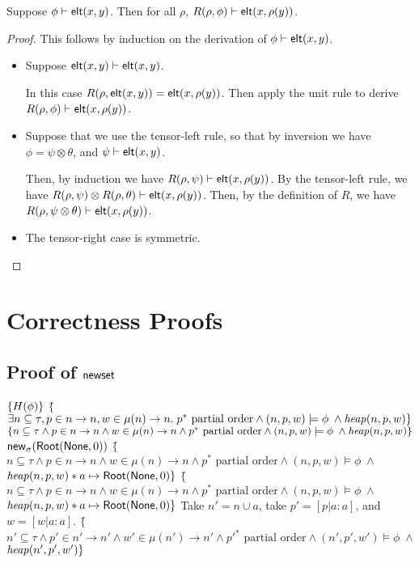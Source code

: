 \begin{lemma}
  Suppose ${\phi} \vdash \mathsf{elt}({x}, {y})$. Then for all $\rho$, ${R(\rho, \phi)} \vdash \mathsf{elt}({x}, {\rho(y)})$. 
\end{lemma}

\begin{proof}
This follows by induction on the derivation of ${\phi} \vdash \mathsf{elt}({x}, {y})$. 
\begin{itemize}
\item Suppose ${\mathsf{elt}({x}, {y})} \vdash \mathsf{elt}({x}, {y})$. 

In this case $R(\rho, \mathsf{elt}({x}, {y})) = \mathsf{elt}({x}, {\rho(y)})$. Then apply the 
unit rule to derive ${R(\rho, \phi)} \vdash \mathsf{elt}({x}, {\rho(y)})$. 

\item Suppose that we use the tensor-left rule, so that by inversion we have
$\phi = \psi \otimes \theta$, and ${\psi} \vdash \mathsf{elt}({x}, {y})$. 

Then, by induction we have ${R(\rho, \psi)} \vdash \mathsf{elt}({x}, {\rho(y)})$. 
By the tensor-left rule, we have ${R(\rho, \psi) \otimes R(\rho, \theta)} \vdash \mathsf{elt}({x}, {\rho(y)})$. Then, by the definition of $R$, we have ${R(\rho, \psi \otimes \theta)} \vdash \mathsf{elt}({x}, {\rho(y)})$.

\item The tensor-right case is symmetric. 
\end{itemize}
\end{proof}
\section{Correctness Proofs}

\subsection{Proof of $\mathsf{newset}$}

\begin{specification}
\nextline
  $\{{H(\phi)}\}$ 
\nextline 
  $\{$\=$\exists n \subseteq \tau, p \in n \to n, w \in \mu(n) \to n.\;
      p^{*} \mbox{ partial order} \land 
             (n, p, w) \models \phi \;\land \mathit{heap}(n, p, w) \}$
\nextline 
  $\{n \subseteq \tau \land p \in n \to n \land w \in \mu(n) \to n \land
      p^{*} \mbox{ partial order} \land 
             (n, p, w) \models \phi \;\land \mathit{heap}(n, p, w) \}$
\nextline
  $\mathsf{new}_{\sigma}(\mathsf{Root}(\mathsf{None}, 0))$ 
\nextline
  $\{$\=$n \subseteq \tau \land p \in n \to n \land w \in \mu(n) \to n \land
      p^{*} \mbox{ partial order} \land 
             (n, p, w) \models \phi \;\land$
\nextline \>
        $\mathit{heap}(n, p, w) * a \mapsto \mathsf{Root}(\mathsf{None}, 0) \}$ 
\nextline
  $\{$\=$n \subseteq \tau \land p \in n \to n \land w \in \mu(n) \to n \land
      p^{*} \mbox{ partial order} \land 
             (n, p, w) \models \phi \;\land$
\nextline \>
        $\mathit{heap}(n, p, w) * a \mapsto \mathsf{Root}(\mathsf{None}, 0) \}$ 
\nextline Take $n' = n \cup {a}$, take $p' = [p|a:a]$, and $w = [w|a:a]$. 
  $\{$\=$n' \subseteq \tau \land p' \in n' \to n' \land w' \in \mu(n') \to n' \land
      p'^{*} \mbox{ partial order} \land 
             (n', p', w') \models \phi \;\land$
\nextline \>
        $\mathit{heap}(n', p', w')\}$ 

\end{specification}



